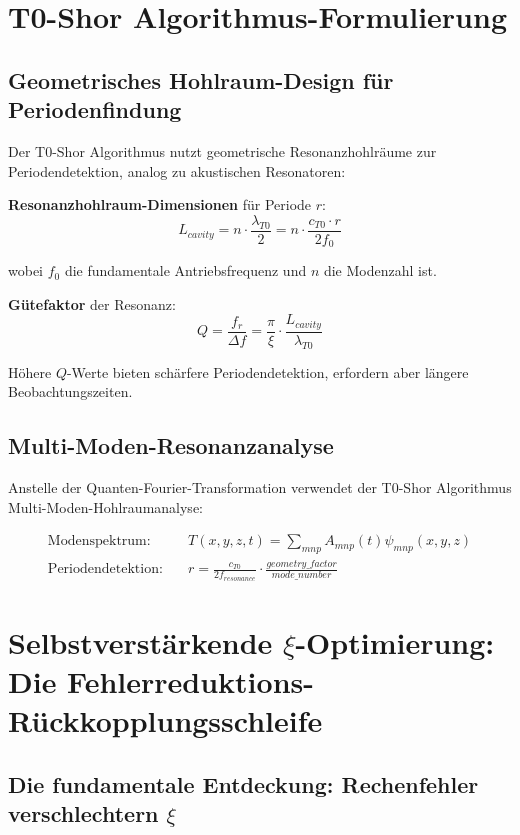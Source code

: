 \documentclass[12pt,a4paper]{article}
\newcommand{\xipar}{\xi}
\begin{document}
	\section{T0-Shor Algorithmus-Formulierung}
	
	\subsection{Geometrisches Hohlraum-Design für Periodenfindung}
	
	Der T0-Shor Algorithmus nutzt geometrische Resonanzhohlräume zur Periodendetektion, analog zu akustischen Resonatoren:
	
	\textbf{Resonanzhohlraum-Dimensionen} für Periode $r$:
	\begin{equation}
		L_{cavity} = n \cdot \frac{\lambda_{T0}}{2} = n \cdot \frac{c_{T0} \cdot r}{2f_0}
	\end{equation}
	
	wobei $f_0$ die fundamentale Antriebsfrequenz und $n$ die Modenzahl ist.
	
	\textbf{Gütefaktor} der Resonanz:
	\begin{equation}
		Q = \frac{f_r}{\Delta f} = \frac{\pi}{\xipar} \cdot \frac{L_{cavity}}{\lambda_{T0}}
	\end{equation}
	
	Höhere $Q$-Werte bieten schärfere Periodendetektion, erfordern aber längere Beobachtungszeiten.
	
	\subsection{Multi-Moden-Resonanzanalyse}
	
	Anstelle der Quanten-Fourier-Transformation verwendet der T0-Shor Algorithmus Multi-Moden-Hohlraumanalyse:
	
	\begin{align}
		\text{Modenspektrum}: \quad &T(x,y,z,t) = \sum_{mnp} A_{mnp}(t) \psi_{mnp}(x,y,z) \\
		\text{Periodendetektion}: \quad &r = \frac{c_{T0}}{2f_{resonance}} \cdot \frac{geometry\_factor}{mode\_number}
	\end{align}
	
	\section{Selbstverstärkende $\xipar$-Optimierung: Die Fehlerreduktions-Rückkopplungsschleife}
	
	\subsection{Die fundamentale Entdeckung: Rechenfehler verschlechtern $\xipar$}
	
\end{document}
